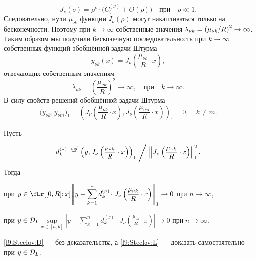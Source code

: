 \begin{equation*}
	 J_{\nu}(\rho)=\rho^{\nu}\cdot\Big(C_0^{(\nu)}+O(\rho)\Big)\quad\text{при}\quad\rho\ll1.
\end{equation*}
Следовательно, нули $\mu_{\nu k}$ функции $J_{\nu}(\rho)$ могут накапливаться только на бесконечности. Поэтому при $k\to\infty$ собственные значения $\lambda_{\nu k}\?=\left(\mu_{\nu k}/R\right)^2\to\infty$. Таким образом мы получили бесконечную последовательность при $k\to\infty$ собственных функций обобщённой задачи Штурма
\begin{equation*}
	 y_{\nu k}(x)=J_{\nu}\left(\frac{\mu_{\nu k}}{R}\cdot x\right),
\end{equation*}
отвечающих собственным значениям 
\begin{equation*}
	 \lambda_{\nu k}=\left(\frac{\mu_{\nu k}}{R}\right)^2\to\infty,\quad\text{при}\quad k\to\infty.
\end{equation*}
В силу свойств решений обобщённой задачи Штурма 
\begin{equation*}
	\big(y_{\nu k},y_{\nu m}\big)_1=\left(J_{\nu}\left(\frac{\mu_{\nu k}}{R}\cdot x\right),J_{\nu}\left(\frac{\mu_{\nu m}}{R}\cdot x\right)\right)_1=0,\quad k\neq m.
\end{equation*}
\begin{Teor}[Стеклова]
	Пусть
	\begin{equation*}
		 d_k^{(\nu)}\stackrel{\hspace{0.09 cm}de\!f}{=}\left(y,J_{\nu}\left(\frac{\mu_{\nu k}}{R}\cdot x\right)\right)_1\Biggm/\left\|J_{\nu}\left(\frac{\mu_{\nu k}}{R}\cdot x\right)\right\|_1^2.
	\end{equation*} 
	Тогда 
	\begin{enumerateP1}
		\item\label{l9:Steclov:L}при $y\in\fLr[{[0,R];x}]$\quad $\displaystyle\left\|y-\sum\limits_{k=1}^{n}d_k^{(\nu)}\cdot J_{\nu}\left(\frac{\mu_{\nu k}}{R}\cdot x\right)\right\|_1\to0$ при $n\to\infty$,
		\item\label{l9:Steclov:D}при $y\in\mathcal{D}_L$\quad$\displaystyle\sup\limits_{x\in[a,b]}\left|y-\sum\limits_{k=1}^{n}d_k^{(\nu)}\cdot J_{\nu}\left(\frac{\mu_{\nu k}}{R}\cdot x\right)\right|\to0$ при $n\to\infty$. 
	\end{enumerateP1} 
\end{Teor}
\noindent\ref{l9:Steclov:D} --- без доказательства, а \ref{l9:Steclov:L} --- доказать самостоятельно при $y\?\in\mc{D}_L$. 


